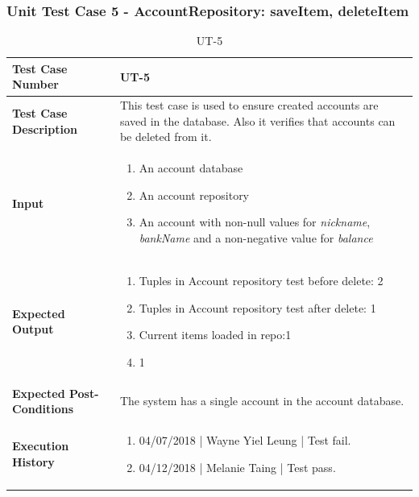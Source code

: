 \documentclass[12pt]{article}
\begin{document}
\subsubsection{Unit Test Case 5 - AccountRepository: saveItem, deleteItem}
\begin{table}[htbp]
\centering
\caption {UT-5}
\label{UT-5}
\begin{tabularx}{\textwidth}{ | l | X |}
\hline
\textbf{Test Case Number}      &  UT-5                     \\ \hline
\textbf{Test Case Description}    &  This test case is used to ensure created accounts are saved in the database. Also it verifies that accounts can be deleted from it.                 \\ \hline
\textbf{Input}         & 	\begin{enumerate}
  
\item An account database
\item An account repository
\item An account with non-null values for \textit{nickname}, \textit{bankName} and a non-negative value for \textit{balance}
  
\end{enumerate} \\ \hline

\textbf{Expected Output}     & \begin{enumerate}
\item Tuples in Account repository test before delete: 2 
\item Tuples in Account repository test after delete: 1 
\item Current items loaded in repo:1 
\item 1

\end{enumerate} \\ \hline
\textbf{Expected Post-Conditions} & The system has a single account in the account database. \\
\hline
\textbf{Execution History}   &  \begin{enumerate}
	\item 04/07/2018 | Wayne Yiel Leung | Test fail.
	\item 04/12/2018 | Melanie Taing | Test pass.
\end {enumerate} \\ \hline
\end{tabularx}
\end{table}
\clearpage
\end{document}
